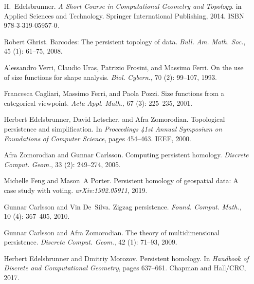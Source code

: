 H.~Edelsbrunner.
\newblock \emph{A Short Course in Computational Geometry and Topology}.
 in Applied Sciences and Technology. {Springer
    International Publishing}, 2014.
\newblock ISBN 978-3-319-05957-0.

Robert Ghrist.
\newblock Barcodes: The persistent topology of data.
\newblock \emph{Bull. Am. Math. Soc.}, 45 (1): 61--75, 2008.

Alessandro Verri, Claudio Uras, Patrizio Frosini, and Massimo Ferri.
\newblock On the use of size functions for shape analysis.
\newblock \emph{Biol. Cybern.}, 70 (2): 99--107, 1993.

Francesca Cagliari, Massimo Ferri, and Paola Pozzi.
\newblock Size functions from a categorical viewpoint.
\newblock \emph{Acta Appl. Math.}, 67 (3): 225--235, 2001.

Herbert Edelsbrunner, David Letscher, and Afra Zomorodian.
\newblock Topological persistence and simplification.
\newblock In \emph{Proceedings 41st Annual Symposium on Foundations of Computer
    Science}, pages 454--463. {IEEE}, 2000.

Afra Zomorodian and Gunnar Carlsson.
\newblock Computing persistent homology.
\newblock \emph{Discrete Comput. Geom.}, 33 (2): 249--274,
2005.

Michelle Feng and Mason~A Porter.
\newblock Persistent homology of geospatial data: {{A}} case study with voting.
\newblock \emph{arXiv:1902.05911}, 2019.

Gunnar Carlsson and Vin De~Silva.
\newblock Zigzag persistence.
\newblock \emph{Found. Comput. Math.}, 10 (4): 367--405,
2010.

Gunnar Carlsson and Afra Zomorodian.
\newblock The theory of multidimensional persistence.
\newblock \emph{Discrete Comput. Geom.}, 42 (1): 71--93,
2009.

Herbert Edelsbrunner and Dmitriy Morozov.
\newblock Persistent homology.
\newblock In \emph{Handbook of Discrete and Computational Geometry}, pages
637--661. {Chapman and Hall/CRC}, 2017.

